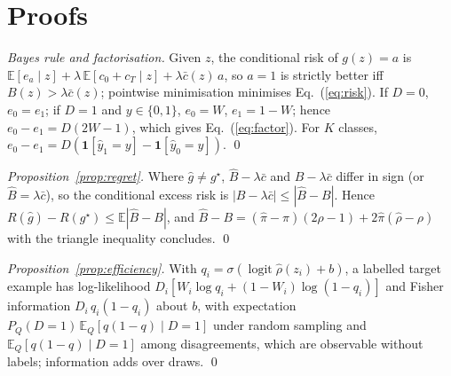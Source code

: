 \section{Proofs}
\label{app:proofs}

\noindent\emph{Bayes rule and factorisation.} Given $z$, the conditional risk of $g(z)=a$ is $\mathbb E[e_a\mid z]+\lambda\,\mathbb E[c_0+c_T\mid z]+\lambda\bar c(z)\,a$, so $a=1$ is strictly better iff $B(z)>\lambda\bar c(z)$; pointwise minimisation minimises Eq.~(\ref{eq:risk}). If $D=0$, $e_0=e_1$; if $D=1$ and $y\in\{0,1\}$, $e_0=W$, $e_1=1-W$; hence $e_0-e_1=D(2W-1)$, which gives Eq.~(\ref{eq:factor}). For $K$ classes, $e_0-e_1=D(\mathbf 1[\hat y_1{=}y]-\mathbf 1[\hat y_0{=}y])$. \qed

\emph{Proposition~\ref{prop:regret}.} Where $\hat g\neq g^\star$, $\hat B-\lambda\bar c$ and $B-\lambda\bar c$ differ in sign (or $\hat B=\lambda\bar c$), so the conditional excess risk is $|B-\lambda\bar c|\le|\hat B-B|$. Hence $R(\hat g)-R(g^\star)\le\mathbb E|\hat B-B|$, and $\hat B-B=(\hat\pi-\pi)(2\rho-1)+2\hat\pi(\hat\rho-\rho)$ with the triangle inequality concludes. \qed

\emph{Proposition~\ref{prop:efficiency}.} With $q_i=\sigma(\operatorname{logit}\hat\rho(z_i)+b)$, a labelled target example has log-likelihood $D_i[W_i\log q_i+(1-W_i)\log(1-q_i)]$ and Fisher information $D_i\,q_i(1-q_i)$ about $b$, with expectation $P_Q(D{=}1)\,\mathbb E_Q[q(1-q)\mid D{=}1]$ under random sampling and $\mathbb E_Q[q(1-q)\mid D{=}1]$ among disagreements, which are observable without labels; information adds over draws. \qed
